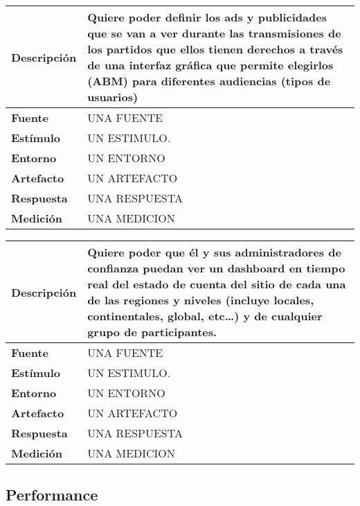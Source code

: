 \begin{center}
  \begin{tabular}{| l | p{10cm} | }
    \hline
  \textbf{Descripción} & Quiere poder definir los ads y publicidades que se van a ver durante las transmisiones de los partidos que ellos tienen derechos a través de una interfaz gráfica que permite elegirlos (ABM) para diferentes audiencias (tipos de usuarios)\\  \hline
  \textbf{Fuente} & UNA FUENTE\\  \hline
  \textbf{Estímulo} & UN ESTIMULO.\\  \hline
  \textbf{Entorno} & UN ENTORNO\\  \hline
  \textbf{Artefacto} & UN ARTEFACTO\\  \hline
  \textbf{Respuesta} & UNA RESPUESTA\\  \hline
  \textbf{Medición} & UNA MEDICION\\  \hline
  \end{tabular}
\end{center} 

\begin{center}
  \begin{tabular}{| l | p{10cm} | }
    \hline
  \textbf{Descripción} & Quiere poder que él y sus administradores de confianza puedan ver un dashboard en tiempo real del estado de cuenta del sitio de cada una de las regiones y niveles (incluye locales, continentales, global, etc…) y de cualquier grupo de participantes. 
\\  \hline
  \textbf{Fuente} & UNA FUENTE\\  \hline
  \textbf{Estímulo} & UN ESTIMULO.\\  \hline
  \textbf{Entorno} & UN ENTORNO\\  \hline
  \textbf{Artefacto} & UN ARTEFACTO\\  \hline
  \textbf{Respuesta} & UNA RESPUESTA\\  \hline
  \textbf{Medición} & UNA MEDICION\\  \hline
  \end{tabular}
\end{center} 

















\subsection{Performance}



